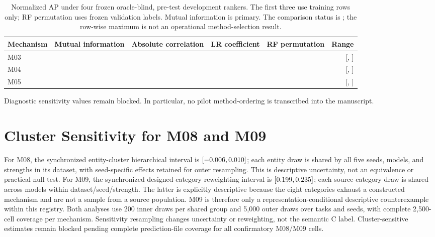 \documentclass[letterpaper]{article}
\begin{document}
\begin{table}[t]
\centering
\small
\begin{tabular}{lrrrrr}
\toprule
Mechanism & Mutual information & Absolute correlation & LR coefficient & RF permutation & Range \\
\midrule
M03 & \LBMThreeMIDetectability{} & \LBMThreeCorrelationDetectability{} &
\LBMThreeLRCoefficientDetectability{} & \LBMThreeRFPermutationDetectability{} &
[\LBMThreeDiagnosticMin{}, \LBMThreeDiagnosticMax{}] \\
M04 & \LBMFourMIDetectability{} & \LBMFourCorrelationDetectability{} &
\LBMFourLRCoefficientDetectability{} & \LBMFourRFPermutationDetectability{} &
[\LBMFourDiagnosticMin{}, \LBMFourDiagnosticMax{}] \\
M05 & \LBMFiveMIDetectability{} & \LBMFiveCorrelationDetectability{} &
\LBMFiveLRCoefficientDetectability{} & \LBMFiveRFPermutationDetectability{} &
[\LBMFiveDiagnosticMin{}, \LBMFiveDiagnosticMax{}] \\
\bottomrule
\end{tabular}
\caption{Normalized AP under four frozen oracle-blind, pre-test development
rankers.  The first three use training rows only; RF permutation uses frozen
validation labels.  Mutual information is primary.  The comparison status is
\emph{\LBDiagnosticConditionalStatus{}}; the row-wise maximum is not an
operational method-selection result.}
\label{tab:diagnostic-sensitivity}
\end{table}
\else
Diagnostic sensitivity values remain blocked.  In particular, no pilot
method-ordering is transcribed into the manuscript.
\fi

\section{Cluster Sensitivity for M08 and M09}
\ifLBResultsReady
For M08, the synchronized entity-cluster hierarchical interval is
$[-0.006,0.010]$; each entity draw is shared by
all five seeds, models, and strengths in its dataset, with seed-specific effects
retained for outer resampling.  This is descriptive uncertainty, not an
equivalence or practical-null test.  For M09, the synchronized
designed-category reweighting interval is
$[0.199,0.235]$; each source-category draw is
shared across models within dataset/seed/strength.  The latter is explicitly
descriptive because the eight categories exhaust a constructed mechanism and
are not a sample from a source population.  M09 is therefore only a
representation-conditional descriptive counterexample within this registry.
Both analyses use 200 inner draws per shared group and 5,000 outer draws over
tasks and seeds, with complete 2,500-cell coverage per mechanism.  Sensitivity
resampling changes uncertainty or reweighting, not the semantic C label.
\else
Cluster-sensitive estimates remain blocked pending complete prediction-file
coverage for all confirmatory M08/M09 cells.
\fi
\end{document}
